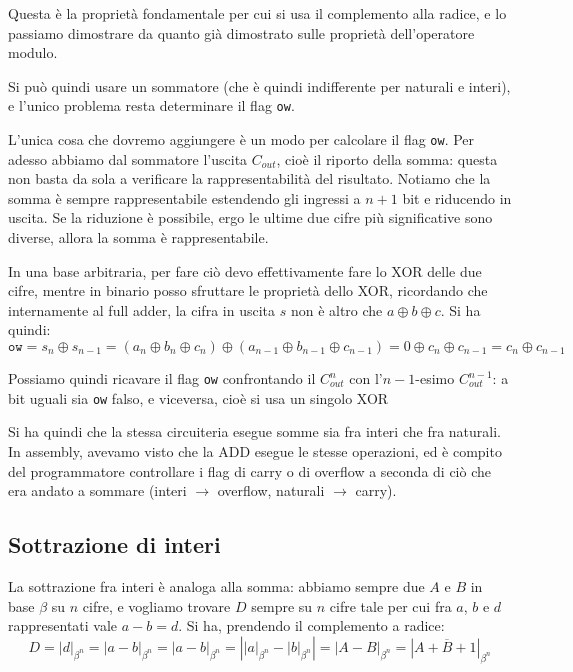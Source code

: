 \documentclass[a4paper,11pt]{article}
\begin{document}
Questa è la proprietà fondamentale per cui si usa il complemento alla radice, e lo passiamo dimostrare da quanto già dimostrato sulle proprietà dell'operatore modulo.

Si può quindi usare un sommatore (che è quindi indifferente per naturali e interi), e l'unico problema resta determinare il flag \lstinline|ow|.

L'unica cosa che dovremo aggiungere è un modo per calcolare il flag \lstinline|ow|.
Per adesso abbiamo dal sommatore l'uscita $C_{out}$, cioè il riporto della somma: questa non basta da sola a verificare la rappresentabilità del risultato.
Notiamo che la somma è sempre rappresentabile estendendo gli ingressi a $n+1$ bit e riducendo in uscita. Se la riduzione è possibile, ergo le ultime due cifre più significative sono diverse, allora la somma è rappresentabile.

In una base arbitraria, per fare ciò devo effettivamente fare lo XOR delle due cifre, mentre in binario posso sfruttare le proprietà dello XOR, ricordando che internamente al full adder, la cifra in uscita $s$ non è altro che $a \oplus b \oplus c$. Si ha quindi:
$$
\mathtt{ow} = s_n \oplus s_{n-1} = (a_{n} \oplus b_{n} \oplus c_{n}) \oplus (a_{n-1} \oplus b_{n-1} \oplus c_{n-1}) = 0 \oplus c_n \oplus c_{n-1} = c_n \oplus c_{n-1}
$$

Possiamo quindi ricavare il flag \lstinline|ow| confrontando il $C^{n}_{out}$ con l'$n-1$-esimo $C^{n-1}_{out}$: a bit uguali sia \lstinline|ow| falso, e viceversa, cioè si usa un singolo XOR

Si ha quindi che la stessa circuiteria esegue somme sia fra interi che fra naturali.
In assembly, avevamo visto che la ADD esegue le stesse operazioni, ed è compito del programmatore controllare i flag di carry o di overflow a seconda di ciò che era andato a sommare (interi $\rightarrow$ overflow, naturali $\rightarrow$ carry).

\subsection{Sottrazione di interi}
La sottrazione fra interi è analoga alla somma: abbiamo sempre due $A$ e $B$ in base $\beta$ su $n$ cifre, e vogliamo trovare $D$ sempre su $n$ cifre tale per cui fra $a$, $b$ e $d$ rappresentati vale $a - b = d$.
Si ha, prendendo il complemento a radice:
$$  
D = |d|_{\beta^n} = |a-b|_{\beta^n} = \left| a - b \right|_{\beta^{n}} = \left| |a|_{\beta^n} - |b|_{\beta^n} \right| = |A - B|_{\beta^n} = |A + \overline{B} + 1|_{\beta^n}
$$
\end{document}
